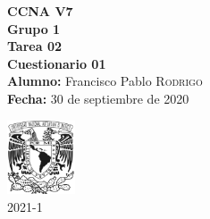 \documentclass{article}
\newcommand{\materia}{CCNA V7}
\newcommand{\grupo}{1}
\newcommand{\semestre}{2021-1}
\newcommand{\alumno}{Francisco Pablo \textsc{Rodrigo}}
\newcommand{\actividad}{Tarea 02}
\newcommand{\titulo}{Cuestionario 01}
\newcommand{\fechaEntrega}{30 de septiembre de 2020}
\begin{document}
\begin{minipage}[t]{0.7\linewidth}
    \vspace{-1cm}
    \large{\textbf{\materia}}\\
    \large{\textbf{Grupo \grupo}}\\
    \textbf{\actividad}\\
    \textbf{\titulo} \\

    \large{\textbf{Alumno:} \alumno} \\
    \textbf{Fecha:} \fechaEntrega%
\end{minipage}\hfill
\begin{minipage}[t]{0.2\linewidth}
    \vspace{-1.2cm}
    \begin{flushright}
        \includegraphics[width=2cm]{unam.jpg}\\
        \large{\semestre}    
    \end{flushright}
\end{minipage}
\vspace{5mm}
\end{document}
